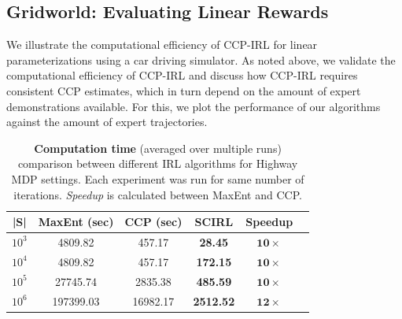 \documentclass{article}
\def\MSHangBox#1{%
\begin{minipage}[t]{\textwidth}%
\begin{tabbing} %
~\\[-\baselineskip] %
#1 %
\end{tabbing}%
\end{minipage}} %
\begin{document}
\subsection{Gridworld: Evaluating Linear Rewards} 

We illustrate the computational efficiency of CCP-IRL for linear parameterizations using a car driving simulator.
As noted above, we validate the computational efficiency of CCP-IRL and discuss how CCP-IRL requires consistent CCP estimates, which in turn depend on the amount of expert demonstrations available. For this, we plot the performance of our algorithms against the amount of expert trajectories.

\begin{table}[t]
\centering
\def\arraystretch{1.0}%
\begin{tabular}{|c|c|c|c|c|c|}
\hline
|S| & MaxEnt (sec) & CCP (sec) & SCIRL & Speedup \\\hline
$10^3$ & 4809.82 & 457.17  & \textbf{28.45} & $\mathbf{10}\times$ \\
$10^4$ & 4809.82 & 457.17 & \textbf{172.15} & $\mathbf{10}\times$ \\
$10^5$ & 27745.74 & 2835.38 & \textbf{485.59} & $\mathbf{10}\times$ \\
$10^6$ & 197399.03 & 16982.17 & \textbf{2512.52} & $\mathbf{12}\times$ \\
\hline
\end{tabular}
\caption{\textbf{Computation time} (averaged over multiple runs) comparison between different IRL algorithms for Highway MDP settings. Each experiment was run for same number of iterations. \textit{Speedup} is calculated between MaxEnt and CCP. 
}
\label{table:table_results_macro_cells}
\end{table}

\end{document}
